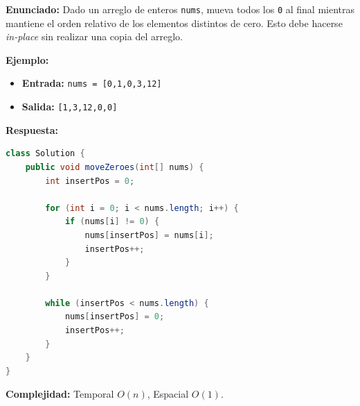 \documentclass[11pt,a4paper]{article}
\begin{document}
\textbf{Enunciado:} Dado un arreglo de enteros \texttt{nums}, mueva todos los \texttt{0} al final mientras mantiene el orden relativo de los elementos distintos de cero. Esto debe hacerse \textit{in-place} sin realizar una copia del arreglo.

\textbf{Ejemplo:}
\begin{itemize}
    \item \textbf{Entrada:} \texttt{nums = [0,1,0,3,12]}
    \item \textbf{Salida:} \texttt{[1,3,12,0,0]}
\end{itemize}

\textbf{Respuesta:}
\begin{lstlisting}[language=Java]
class Solution {
    public void moveZeroes(int[] nums) {
        int insertPos = 0;
        
        for (int i = 0; i < nums.length; i++) {
            if (nums[i] != 0) {
                nums[insertPos] = nums[i];
                insertPos++;
            }
        }
        
        while (insertPos < nums.length) {
            nums[insertPos] = 0;
            insertPos++;
        }
    }
}
\end{lstlisting}
\textbf{Complejidad:} Temporal $O(n)$, Espacial $O(1)$.
\end{document}
